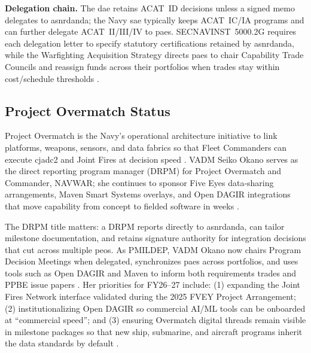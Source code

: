 \documentclass[../main.tex]{subfiles}
\begin{document}
\textbf{Delegation chain.} The \ac{dae} retains ACAT~ID decisions unless a signed memo delegates to \ac{asnrdanda}; the Navy \ac{sae} typically keeps ACAT~IC/IA programs and can further delegate ACAT~II/III/IV to \acp{pae}. SECNAVINST~5000.2G requires each delegation letter to specify statutory certifications retained by \ac{asnrdanda}, while the Warfighting Acquisition Strategy directs \acp{pae} to chair Capability Trade Councils and reassign funds across their portfolios when trades stay within cost/schedule thresholds \autocite{SECNAV5000-2G,secwar-acq-transformation-2025}.

\subsection{Project Overmatch Status}
Project Overmatch is the Navy's operational architecture initiative to link platforms, weapons, sensors, and data fabrics so that Fleet Commanders can execute \ac{cjadc2} and Joint Fires at decision speed \autocite{DVIDS-Overmatch-OpenDAGIR-2025,DVIDS-Overmatch-FVEY-2025}. VADM Seiko Okano serves as the direct reporting program manager (DRPM) for Project Overmatch and Commander, NAVWAR; she continues to sponsor Five Eyes data-sharing arrangements, Maven Smart Systems overlays, and Open DAGIR integrations that move capability from concept to fielded software in weeks \autocite{DVIDS-Okano-2024,DVIDS-Overmatch-OpenDAGIR-2025}.

The DRPM title matters: a DRPM reports directly to \ac{asnrdanda}, can tailor milestone documentation, and retains signature authority for integration decisions that cut across multiple \acp{peo}. As PMILDEP, VADM Okano now chairs Program Decision Meetings when delegated, synchronizes \acp{pae} across portfolios, and uses tools such as Open DAGIR and Maven to inform both requirements trades and PPBE issue papers \autocite{SECNAV5000-2G,DVIDS-Overmatch-OpenDAGIR-2025}. Her priorities for FY26--27 include: (1) expanding the Joint Fires Network interface validated during the 2025 FVEY Project Arrangement; (2) institutionalizing Open DAGIR so commercial AI/ML tools can be onboarded at “commercial speed”; and (3) ensuring Overmatch digital threads remain visible in milestone packages so that new ship, submarine, and aircraft programs inherit the data standards by default \autocite{DVIDS-Overmatch-FVEY-2025,DVIDS-Overmatch-OpenDAGIR-2025}.
\end{document}
